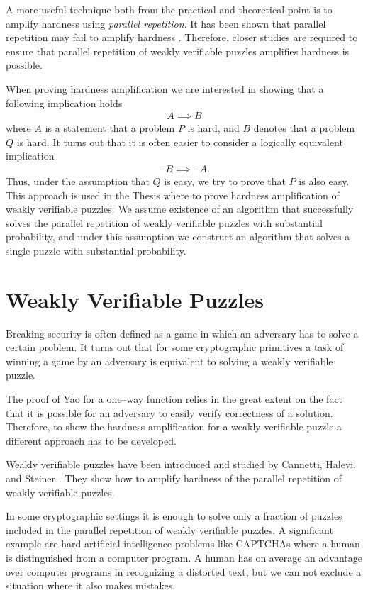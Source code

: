 \documentclass[11pt,a4paper,titlepage]{memoir}
\begin{document}
A more useful technique both from the practical and theoretical point is to amplify hardness using \textit{parallel repetition}.
It has been shown that parallel repetition may fail to amplify hardness \cite{bellare1997does}.
Therefore, closer studies are required to ensure that parallel repetition of weakly verifiable puzzles amplifies hardness is possible.

When proving hardness amplification we are interested in showing that a following implication holds
\begin{align*}
  A \implies B
\end{align*}
where $A$ is a statement that a problem $P$ is hard, and $B$ denotes that a problem $Q$ is hard.
It turns out that it is often easier to consider a logically equivalent implication
\begin{align*}
  \lnot B \implies \lnot A.
\end{align*}
Thus, under the assumption that $Q$ is easy, we try to prove that $P$ is also easy.
This approach is used in the Thesis where to prove hardness amplification of weakly verifiable puzzles.
We assume existence of an algorithm that successfully solves the parallel repetition of weakly verifiable puzzles with substantial probability, and
under this assumption we construct an algorithm that solves a single puzzle with substantial probability.

\section{Weakly Verifiable Puzzles}
Breaking security is often defined as a game in which an adversary has to solve a certain problem.
It turns out that for some cryptographic primitives a task of winning a game by an adversary
is equivalent to solving a weakly verifiable puzzle.

The proof of Yao for a one--way function relies in the great extent on the fact that it is possible
for an adversary to easily verify correctness of a solution.
Therefore, to show the hardness amplification for a weakly verifiable puzzle
a different approach has to be developed.

Weakly verifiable puzzles have been introduced and studied by Cannetti, Halevi, and Steiner \cite{canetti2004hardness}.
They show how to amplify hardness of the parallel repetition of weakly verifiable puzzles.

In some cryptographic settings it is enough to solve only a fraction of puzzles included in the parallel repetition of weakly verifiable puzzles.
A significant example are hard artificial intelligence problems like CAPTCHAs where a human is distinguished from a computer program.
A human has on average an advantage over computer programs in recognizing a distorted text, but we can not exclude a situation where it also makes mistakes.
\end{document}
